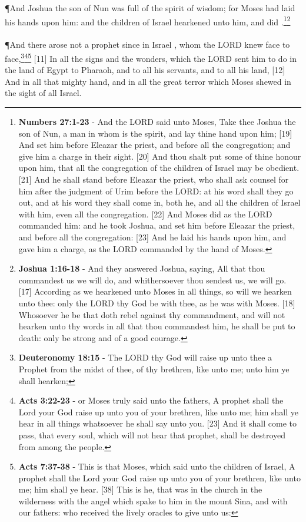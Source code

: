 \P \textcolor[cmyk]{0.99998,1,0,0}{And Joshua the son of Nun was full of the spirit of wisdom; for Moses had laid his hands upon him: and the children of Israel hearkened unto him, and did  .}\footnote{\textbf{Numbers 27:1-23} - And the LORD said unto Moses, Take thee Joshua the son of Nun, a man in whom is the spirit, and lay thine hand upon him; [19] And set him before Eleazar the priest, and before all the congregation; and give him a charge in their sight. [20] And thou shalt put some of thine honour upon him, that all the congregation of the children of Israel may be obedient. [21] And he shall stand before Eleazar the priest, who shall ask counsel for him after the judgment of Urim before the LORD: at his word shall they go out, and at his word they shall come in, both he, and all the children of Israel with him, even all the congregation. [22] And Moses did as the LORD commanded him: and he took Joshua, and set him before Eleazar the priest, and before all the congregation: [23] And he laid his hands upon him, and gave him a charge, as the LORD commanded by the hand of Moses.}\footnote{\textbf{Joshua 1:16-18} - And they answered Joshua, saying, All that thou commandest us we will do, and whithersoever thou sendest us, we will go. [17] According as we hearkened unto Moses in all things, so will we hearken unto thee: only the LORD thy God be with thee, as he was with Moses. [18] Whosoever he be that doth rebel against thy commandment, and will not hearken unto thy words in all that thou commandest him, he shall be put to death: only be strong and of a good courage.}\\
\\
\P \textcolor[cmyk]{0.99998,1,0,0}{And there arose not a prophet since in Israel  , whom the LORD knew face to face,}\footnote{\textbf{Deuteronomy 18:15} - The LORD thy God will raise up unto thee a Prophet from the midst of thee, of thy brethren, like unto me; unto him ye shall hearken;}\footnote{\textbf{Acts 3:22-23} - or Moses truly said unto the fathers, A prophet shall the Lord your God raise up unto you of your brethren, like unto me; him shall ye hear in all things whatsoever he shall say unto you. [23] And it shall come to pass, that every soul, which will not hear that prophet, shall be destroyed from among the people.}\footnote{\textbf{Acts 7:37-38} - This is that Moses, which said unto the children of Israel, A prophet shall the Lord your God raise up unto you of your brethren, like unto me; him shall ye hear. [38] This is he, that was in the church in the wilderness with the angel which spake to him in the mount Sina, and with our fathers: who received the lively oracles to give unto us:}
[11] \textcolor[cmyk]{0.99998,1,0,0}{In all the signs and the wonders, which the LORD sent him to do in the land of Egypt to Pharaoh, and to all his servants, and to all his land,}
[12] \textcolor[cmyk]{0.99998,1,0,0}{And in all that mighty hand, and in all the great terror which Moses shewed in the sight of all Israel.}
